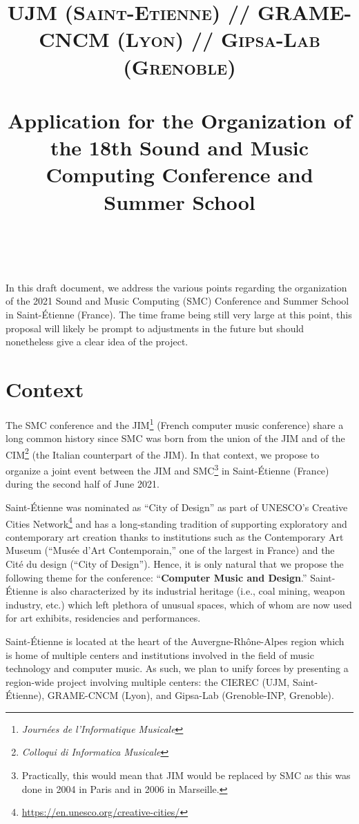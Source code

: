 \documentclass[fontsize=12pt]{scrartcl} %
\title{	
\normalfont \normalsize 
\textsc{UJM (Saint-Etienne) // GRAME-CNCM (Lyon) // Gipsa-Lab (Grenoble)} \\ [25pt] %
\horrule{0.5pt} \\[0.4cm] %
\huge Application for the Organization of the 18th Sound and Music Computing Conference and Summer School \\ %
\horrule{2pt} \\[0.5cm] %
}
\date{} %
\numberwithin{equation}{section} %
\numberwithin{figure}{section} %
\numberwithin{table}{section} %
\begin{document}
\maketitle %

In this draft document, we address the various points regarding the organization of the 2021 Sound and Music Computing (SMC) Conference and Summer School in Saint-Étienne (France). The time frame being still very large at this point, this proposal will likely be prompt to adjustments in the future but should nonetheless give a clear idea of the project. 

\tableofcontents


\section{Context}

The SMC conference and the JIM\footnote{\textit{Journées de l'Informatique Musicale}} (French computer music conference) share a long common history since SMC was born from the union of the JIM and of the CIM\footnote{\textit{Colloqui di Informatica Musicale}} (the Italian counterpart of the JIM). In that context, we propose to organize a joint event between the JIM and SMC\footnote{Practically, this would mean that JIM would be replaced by SMC as this was done in 2004 in Paris and in 2006 in Marseille.} in Saint-Étienne (France) during the second half of June 2021. 

Saint-Étienne was nominated as ``City of Design'' as part of UNESCO's Creative Cities Network\footnote{\url{https://en.unesco.org/creative-cities/}} and has a long-standing tradition of supporting exploratory and contemporary art creation thanks to institutions such as the Contemporary Art Museum (``Musée d'Art Contemporain,'' one of the largest in France) and the Cité du design (``City of Design''). Hence, it is only natural that we propose the following theme for the conference: ``\textbf{Computer Music and Design}.'' Saint-Étienne is also characterized by its industrial heritage (i.e., coal mining, weapon industry, etc.) which left plethora of unusual spaces, which of whom are now used for art exhibits, residencies and performances.

Saint-Étienne is located at the heart of the Auvergne-Rhône-Alpes region which is home of multiple centers and institutions involved in the field of music technology and computer music. As such, we plan to unify forces by presenting a region-wide project involving multiple centers: the CIEREC (UJM, Saint-Étienne), GRAME-CNCM (Lyon), and Gipsa-Lab (Grenoble-INP, Grenoble).
\end{document}
